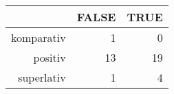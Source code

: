 \begin{tabular}{rrr}
  \hline
 & FALSE & TRUE \\ 
  \hline
komparativ & 1 & 0 \\ 
  positiv & 13 & 19 \\ 
  superlativ & 1 & 4 \\ 
   \hline
\end{tabular}
